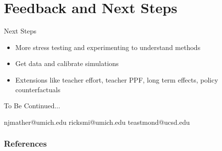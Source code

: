 \documentclass[t,aspectratio=169,11pt]{beamer}
\begin{document}
\section{Feedback and Next Steps}

\begin{frame}[label=next]{Next Steps}

\begin{itemize}

    \item More stress testing and experimenting to understand methods 
    
    \item Get data and calibrate simulations
    
    \item Extensions like teacher effort, teacher PPF, long term effects, policy counterfactuals
\end{itemize}

\end{frame}



\begin{frame}[c,noframenumbering]
\centering
\Huge{\centerline{To Be Continued...}}
\normalsize njmather{\selectfont @}umich.edu \hspace{2em}
ricksmi{\selectfont @}umich.edu \hspace{2em} \normalsize teastmond{\selectfont @}ucsd.edu
\end{frame}



\begin{frame}[noframenumbering]
\frametitle{References}
\tiny

\end{frame}



\appendix


\end{document}
